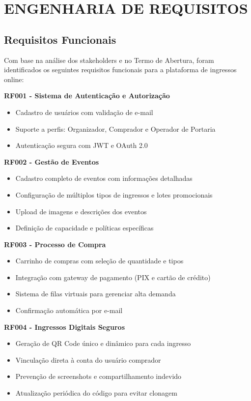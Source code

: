 \chapter{ENGENHARIA DE REQUISITOS}

\section{Requisitos Funcionais}

Com base na análise dos stakeholders e no Termo de Abertura, foram identificados os seguintes requisitos funcionais para a plataforma de ingressos online:

\textbf{RF001 - Sistema de Autenticação e Autorização}
\begin{itemize}
    \item Cadastro de usuários com validação de e-mail
    \item Suporte a perfis: Organizador, Comprador e Operador de Portaria
    \item Autenticação segura com JWT e OAuth 2.0
\end{itemize}

\textbf{RF002 - Gestão de Eventos}
\begin{itemize}
    \item Cadastro completo de eventos com informações detalhadas
    \item Configuração de múltiplos tipos de ingressos e lotes promocionais
    \item Upload de imagens e descrições dos eventos
    \item Definição de capacidade e políticas específicas
\end{itemize}

\textbf{RF003 - Processo de Compra}
\begin{itemize}
    \item Carrinho de compras com seleção de quantidade e tipos
    \item Integração com gateway de pagamento (PIX e cartão de crédito)
    \item Sistema de filas virtuais para gerenciar alta demanda
    \item Confirmação automática por e-mail
\end{itemize}

\textbf{RF004 - Ingressos Digitais Seguros}
\begin{itemize}
    \item Geração de QR Code único e dinâmico para cada ingresso
    \item Vinculação direta à conta do usuário comprador
    \item Prevenção de screenshots e compartilhamento indevido
    \item Atualização periódica do código para evitar clonagem
\end{itemize}


